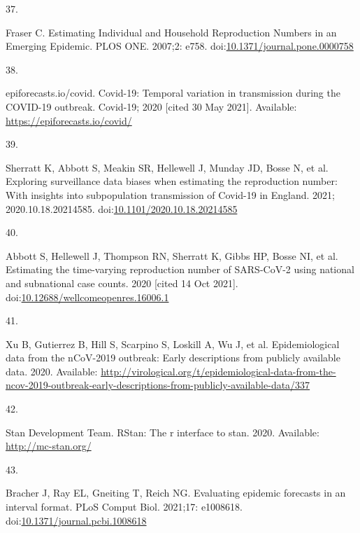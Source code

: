 \documentclass[10pt,letterpaper]{article}
\newlength{\cslhangindent}
\newlength{\csllabelwidth}
\newlength{\cslentryspacingunit} %
\newenvironment{CSLReferences}[2] %
 {%
  \setlength{\parindent}{0pt}
  \ifodd #1
  \let\oldpar\par
  \def\par{\hangindent=\cslhangindent\oldpar}
  \fi
  \setlength{\parskip}{#2\cslentryspacingunit}
 }%
 {}
\newcommand{\CSLLeftMargin}[1]{\parbox[t]{\csllabelwidth}{#1}}
\newcommand{\CSLRightInline}[1]{\parbox[t]{\linewidth - \csllabelwidth}{#1}\break}
\begin{document}
\begin{CSLReferences}{0}{0}
\leavevmode{}%
\CSLLeftMargin{37. }%
\CSLRightInline{Fraser C. Estimating {Individual} and {Household
Reproduction Numbers} in an {Emerging Epidemic}. PLOS ONE. 2007;2: e758.
doi:\href{https://doi.org/10.1371/journal.pone.0000758}{10.1371/journal.pone.0000758}}

\leavevmode{}%
\CSLLeftMargin{38. }%
\CSLRightInline{epiforecasts.io/covid. Covid-19: {Temporal} variation in
transmission during the {COVID-19} outbreak. {Covid-19}; 2020 {[}cited
30 May 2021{]}. Available: \url{https://epiforecasts.io/covid/}}

\leavevmode{}%
\CSLLeftMargin{39. }%
\CSLRightInline{Sherratt K, Abbott S, Meakin SR, Hellewell J, Munday JD,
Bosse N, et al. Exploring surveillance data biases when estimating the
reproduction number: With insights into subpopulation transmission of
{Covid-19} in {England}. 2021; 2020.10.18.20214585.
doi:\href{https://doi.org/10.1101/2020.10.18.20214585}{10.1101/2020.10.18.20214585}}

\leavevmode{}%
\CSLLeftMargin{40. }%
\CSLRightInline{Abbott S, Hellewell J, Thompson RN, Sherratt K, Gibbs
HP, Bosse NI, et al. Estimating the time-varying reproduction number of
{SARS-CoV-2} using national and subnational case counts. 2020 {[}cited
14 Oct 2021{]}.
doi:\href{https://doi.org/10.12688/wellcomeopenres.16006.1}{10.12688/wellcomeopenres.16006.1}}

\leavevmode{}%
\CSLLeftMargin{41. }%
\CSLRightInline{Xu B, Gutierrez B, Hill S, Scarpino S, Loskill A, Wu J,
et al. Epidemiological data from the nCoV-2019 outbreak: Early
descriptions from publicly available data. 2020. Available:
\url{http://virological.org/t/epidemiological-data-from-the-ncov-2019-outbreak-early-descriptions-from-publicly-available-data/337}}

\leavevmode{}%
\CSLLeftMargin{42. }%
\CSLRightInline{Stan Development Team. RStan: The r interface to stan.
2020. Available: \url{http://mc-stan.org/}}

\leavevmode{}%
\CSLLeftMargin{43. }%
\CSLRightInline{Bracher J, Ray EL, Gneiting T, Reich NG. Evaluating
epidemic forecasts in an interval format. PLoS Comput Biol. 2021;17:
e1008618.
doi:\href{https://doi.org/10.1371/journal.pcbi.1008618}{10.1371/journal.pcbi.1008618}}


\end{CSLReferences}
\end{document}
